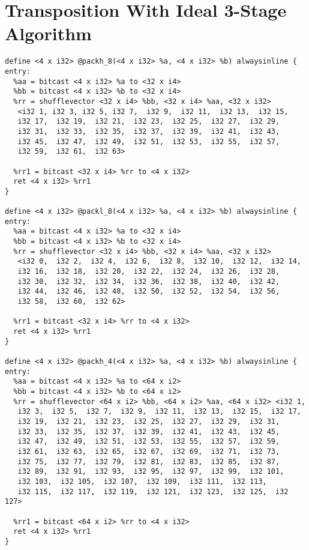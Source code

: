 \section*{Transposition With Ideal 3-Stage Algorithm}
\label{appone:transposition_ideal}
\begin{lstlisting}
define <4 x i32> @packh_8(<4 x i32> %a, <4 x i32> %b) alwaysinline {
entry:
  %aa = bitcast <4 x i32> %a to <32 x i4>
  %bb = bitcast <4 x i32> %b to <32 x i4>
  %rr = shufflevector <32 x i4> %bb, <32 x i4> %aa, <32 x i32>
   <i32 1, i32 3, i32 5, i32 7,  i32 9,  i32 11,  i32 13,  i32 15,
   i32 17,  i32 19,  i32 21,  i32 23,  i32 25,  i32 27,  i32 29,
   i32 31,  i32 33,  i32 35,  i32 37,  i32 39,  i32 41,  i32 43,
   i32 45,  i32 47,  i32 49,  i32 51,  i32 53,  i32 55,  i32 57,
   i32 59,  i32 61,  i32 63>

  %rr1 = bitcast <32 x i4> %rr to <4 x i32>
  ret <4 x i32> %rr1
}

define <4 x i32> @packl_8(<4 x i32> %a, <4 x i32> %b) alwaysinline {
entry:
  %aa = bitcast <4 x i32> %a to <32 x i4>
  %bb = bitcast <4 x i32> %b to <32 x i4>
  %rr = shufflevector <32 x i4> %bb, <32 x i4> %aa, <32 x i32>
   <i32 0,  i32 2,  i32 4,  i32 6,  i32 8,  i32 10,  i32 12,  i32 14,
   i32 16,  i32 18,  i32 20,  i32 22,  i32 24,  i32 26,  i32 28,
   i32 30,  i32 32,  i32 34,  i32 36,  i32 38,  i32 40,  i32 42,
   i32 44,  i32 46,  i32 48,  i32 50,  i32 52,  i32 54,  i32 56,
   i32 58,  i32 60,  i32 62>

  %rr1 = bitcast <32 x i4> %rr to <4 x i32>
  ret <4 x i32> %rr1
}

define <4 x i32> @packh_4(<4 x i32> %a, <4 x i32> %b) alwaysinline {
entry:
  %aa = bitcast <4 x i32> %a to <64 x i2>
  %bb = bitcast <4 x i32> %b to <64 x i2>
  %rr = shufflevector <64 x i2> %bb, <64 x i2> %aa, <64 x i32> <i32 1,
   i32 3,  i32 5,  i32 7,  i32 9,  i32 11,  i32 13,  i32 15,  i32 17,
   i32 19,  i32 21,  i32 23,  i32 25,  i32 27,  i32 29,  i32 31,
   i32 33,  i32 35,  i32 37,  i32 39,  i32 41,  i32 43,  i32 45,
   i32 47,  i32 49,  i32 51,  i32 53,  i32 55,  i32 57,  i32 59,
   i32 61,  i32 63,  i32 65,  i32 67,  i32 69,  i32 71,  i32 73,
   i32 75,  i32 77,  i32 79,  i32 81,  i32 83,  i32 85,  i32 87,
   i32 89,  i32 91,  i32 93,  i32 95,  i32 97,  i32 99,  i32 101,
   i32 103,  i32 105,  i32 107,  i32 109,  i32 111,  i32 113,
   i32 115,  i32 117,  i32 119,  i32 121,  i32 123,  i32 125,  i32 127>

  %rr1 = bitcast <64 x i2> %rr to <4 x i32>
  ret <4 x i32> %rr1
}


\end{lstlisting}
